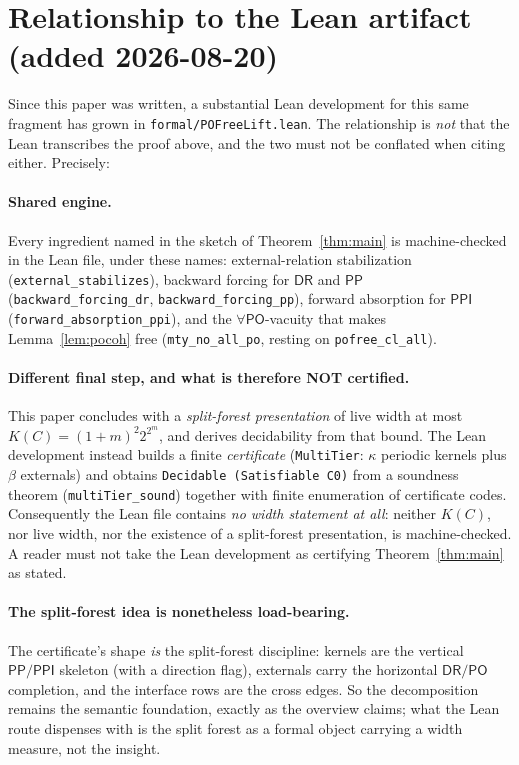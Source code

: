 \documentclass[11pt]{article}
\newcommand{\DR}{\mathsf{DR}}
\newcommand{\PO}{\mathsf{PO}}
\newcommand{\PP}{\mathsf{PP}}
\newcommand{\PPI}{\mathsf{PPI}}
\newcommand{\code}[1]{\texttt{#1}}
\theoremstyle{plain}
\theoremstyle{definition}
\begin{document}
\section{Relationship to the Lean artifact (added 2026-08-20)}
\label{sec:leanrel}

Since this paper was written, a substantial Lean development for this same
fragment has grown in \code{formal/POFreeLift.lean}. The relationship is
\emph{not} that the Lean transcribes the proof above, and the two must not be
conflated when citing either. Precisely:

\paragraph{Shared engine.} Every ingredient named in the sketch of
Theorem~\ref{thm:main} is machine-checked in the Lean file, under these names:
external-relation stabilization (\code{external\_stabilizes}), backward forcing
for $\DR$ and $\PP$ (\code{backward\_forcing\_dr}, \code{backward\_forcing\_pp}),
forward absorption for $\PPI$ (\code{forward\_absorption\_ppi}), and the
$\forall\PO$-vacuity that makes Lemma~\ref{lem:pocoh} free
(\code{mty\_no\_all\_po}, resting on \code{pofree\_cl\_all}).

\paragraph{Different final step, and what is therefore NOT certified.} This paper
concludes with a \emph{split-forest presentation} of live width at most
$K(C)=(1+m)^2 2^{2^m}$, and derives decidability from that bound. The Lean
development instead builds a finite \emph{certificate} (\code{MultiTier}:
$\kappa$ periodic kernels plus $\beta$ externals) and obtains
\code{Decidable (Satisfiable C0)} from a soundness theorem
(\code{multiTier\_sound}) together with finite enumeration of certificate codes.
Consequently the Lean file contains \emph{no width statement at all}: neither
$K(C)$, nor live width, nor the existence of a split-forest presentation, is
machine-checked. A reader must not take the Lean development as certifying
Theorem~\ref{thm:main} as stated.

\paragraph{The split-forest idea is nonetheless load-bearing.} The certificate's
shape \emph{is} the split-forest discipline: kernels are the vertical
$\PP/\PPI$ skeleton (with a direction flag), externals carry the horizontal
$\DR/\PO$ completion, and the interface rows are the cross edges. So the
decomposition remains the semantic foundation, exactly as the overview claims;
what the Lean route dispenses with is the split forest as a formal object
carrying a width measure, not the insight.
\end{document}
